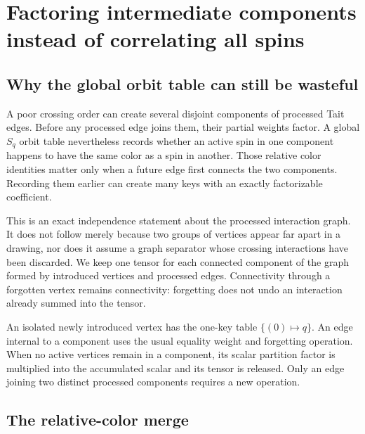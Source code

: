 \section{Factoring intermediate components instead of correlating all spins}
\label{sec:factorization}

\subsection{Why the global orbit table can still be wasteful}

A poor crossing order can create several disjoint components of processed
Tait edges. Before any processed edge joins them, their partial weights
factor. A global $S_q$ orbit table nevertheless records whether an active
spin in one component happens to have the same color as a spin in another.
Those relative color identities matter only when a future edge first
connects the two components. Recording them earlier can create many keys
with an exactly factorizable coefficient.

This is an exact independence statement about the processed interaction
graph. It does not follow merely because two groups of vertices appear far
apart in a drawing, nor does it assume a graph separator whose crossing
interactions have been discarded. We keep one tensor for each connected
component of the graph formed by introduced vertices and processed edges.
Connectivity through a forgotten vertex remains connectivity: forgetting
does not undo an interaction already summed into the tensor.

An isolated newly introduced vertex has the one-key table
$\{(0)\mapsto q\}$. An edge internal to a component uses the usual equality
weight and forgetting operation. When no active vertices remain in a
component, its scalar partition factor is multiplied into the accumulated
scalar and its tensor is released. Only an edge joining two distinct
processed components requires a new operation.

\subsection{The relative-color merge}

